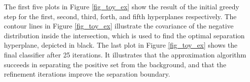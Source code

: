 \documentclass[twoside,11pt]{article}
\begin{document}
\begin{table}[h!]
\center
{}
\caption{AUC for different size partitions of positive and negative classes}\label{TAB:AUC}
\end{table}

The first five plots in Figure \ref{fig_toy_ex} show the result of the initial greedy step for the first, second, third, forth, and fifth hyperplanes respectively. The contour lines in Figure \ref{fig_toy_ex} illustrate the covariance of the negative distribution inside the intersection, which is used to find the optimal separation hyperplane, depicted in black. The last plot in Figure \ref{fig_toy_ex} shows the final classifier after 25 iterations. It illustrates that the approximation algorithm succeeds in separating the positive set from the background, and that the refinement iterations improve the separation boundary.
\end{document}
